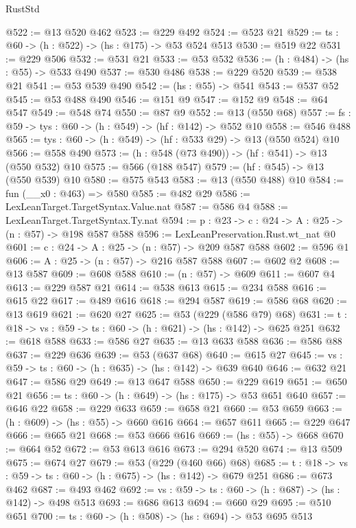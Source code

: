 \begin{lexlean}{RustStd}
\begin{coremodule}
@522 := @13 @520 @462
@523 := @229 @492
@524 := @523 @21
@529 := {ts : @60} -> (h : @522) -> (hs : @175) -> @53 @524 @513
@530 := @519 @22
@531 := @229 @506
@532 := @531 @21
@533 := @53 @532
@536 := (h : @484) -> (hs : @55) -> @533 @490
@537 := @530 @486
@538 := @229 @520
@539 := @538 @21
@541 := @53 @539 @490
@542 := (hs : @55) -> @541
@543 := @537 @52
@545 := @53 @488 @490
@546 := @151 @9
@547 := @152 @9
@548 := @64 @547
@549 := @548 @74
@550 := @87 @9
@552 := @13 (@550 @68)
@557 := {fs : @59} -> {tys : @60} -> (h : @549) -> (hf : @142) -> @552 @10
@558 := @546 @488
@565 := {tys : @60} -> (h : @549) -> (hf : @533 @29) -> @13 (@550 @524) @10
@566 := @558 @490
@573 := (h : @548 (@73 @490)) -> (hf : @541) -> @13 (@550 @532) @10
@575 := @566 (@188 @547)
@579 := (hf : @545) -> @13 (@550 @539) @10
@580 := @575 @543
@583 := @13 (@550 @488) @10
@584 := fun (__x0 : @463) => @580
@585 := @482 @29
@586 := LexLeanTarget.TargetSyntax.Value.nat
@587 := @586 @4
@588 := LexLeanTarget.TargetSyntax.Ty.nat
@594 := {p : @23} -> {c : @24} -> {A : @25} -> (n : @57) -> @198 @587 @588
@596 := LexLeanPreservation.Rust.wt_nat @0
@601 := {c : @24} -> {A : @25} -> (n : @57) -> @209 @587 @588
@602 := @596 @1
@606 := {A : @25} -> (n : @57) -> @216 @587 @588
@607 := @602 @2
@608 := @13 @587
@609 := @608 @588
@610 := (n : @57) -> @609
@611 := @607 @4
@613 := @229 @587 @21
@614 := @538 @613
@615 := @234 @588
@616 := @615 @22
@617 := @489 @616
@618 := @294 @587
@619 := @586 @68
@620 := @13 @619
@621 := @620 @27
@625 := @53 (@229 (@586 @79) @68)
@631 := {t : @18} -> {vs : @59} -> {ts : @60} -> (h : @621) -> (hs : @142) -> @625 @251
@632 := @618 @588
@633 := @586 @27
@635 := @13 @633 @588
@636 := @586 @88
@637 := @229 @636
@639 := @53 (@637 @68)
@640 := @615 @27
@645 := {vs : @59} -> {ts : @60} -> (h : @635) -> (hs : @142) -> @639 @640
@646 := @632 @21
@647 := @586 @29
@649 := @13 @647 @588
@650 := @229 @619
@651 := @650 @21
@656 := {ts : @60} -> (h : @649) -> (hs : @175) -> @53 @651 @640
@657 := @646 @22
@658 := @229 @633
@659 := @658 @21
@660 := @53 @659
@663 := (h : @609) -> (hs : @55) -> @660 @616
@664 := @657 @611
@665 := @229 @647
@666 := @665 @21
@668 := @53 @666 @616
@669 := (hs : @55) -> @668
@670 := @664 @52
@672 := @53 @613 @616
@673 := @294 @520
@674 := @13 @509
@675 := @674 @27
@679 := @53 (@229 (@460 @66) @68)
@685 := {t : @18} -> {vs : @59} -> {ts : @60} -> (h : @675) -> (hs : @142) -> @679 @251
@686 := @673 @462
@687 := @493 @462
@692 := {vs : @59} -> {ts : @60} -> (h : @687) -> (hs : @142) -> @498 @513
@693 := @686 @613
@694 := @660 @29
@695 := @510 @651
@700 := {ts : @60} -> (h : @508) -> (hs : @694) -> @53 @695 @513

\end{coremodule}
\end{lexlean}
